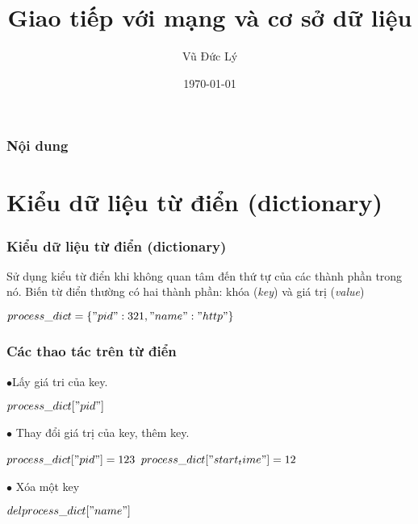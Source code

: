\documentclass{beamer}
\title[Giao tiếp với mạng và cơ sở dữ liệu ]{Giao tiếp với mạng và cơ sở dữ liệu } %
\author{Vũ Đức Lý} %
\date{\today} %
\begin{document}
\begin{frame}
\titlepage %
\hyperlink{intro}{}
\end{frame}

\begin{frame}[label=intro]
\frametitle{Nội dung} %
\tableofcontents %
\end{frame}


\section{Kiểu dữ liệu từ điển (dictionary)} 
\begin{frame}[label=dict]
\frametitle{Kiểu dữ liệu từ điển (dictionary)}
Sử dụng kiểu từ điển khi không quan tâm đến thứ tự của các thành phần trong nó. Biến từ điển thường có hai thành phần: khóa (\textit{key}) và giá trị (\textit{value})

\begin{example}
$process\_dict = \{"pid": 321, "name": "http"\}$
\end{example} 
\hyperlink{intro}{}
\hyperlink{moitruong}{}
\end{frame}

\begin{frame}[label=dictoper]
\frametitle{Các thao tác trên từ điển}
$\bullet$Lấy giá tri của key. 
\begin{example}
$process\_dict["pid"]$
\end{example}
$\bullet$ Thay đổi giá trị của key, thêm key.
\begin{example}
$process\_dict["pid"] = 123$ 
$process\_dict["start_time"] = 12$
\end{example}
$\bullet$ Xóa một key
\begin{example}
$del  process\_dict["name"]$
\end{example}
\hyperlink{teptin}{}
\end{frame}
\end{document}
